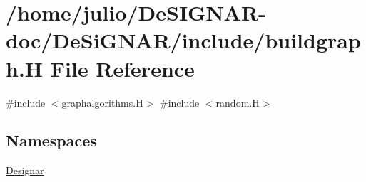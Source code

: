 \hypertarget{buildgraph_8_h}{}\section{/home/julio/\+De\+S\+I\+G\+N\+A\+R-\/doc/\+De\+Si\+G\+N\+A\+R/include/buildgraph.H File Reference}
\label{buildgraph_8_h}
{\ttfamily \#include $<$graphalgorithms.\+H$>$}\newline
{\ttfamily \#include $<$random.\+H$>$}\newline
\subsection*{Namespaces}
\begin{DoxyCompactItemize}
\item 
 \hyperlink{namespace_designar}{Designar}
\end{DoxyCompactItemize}
